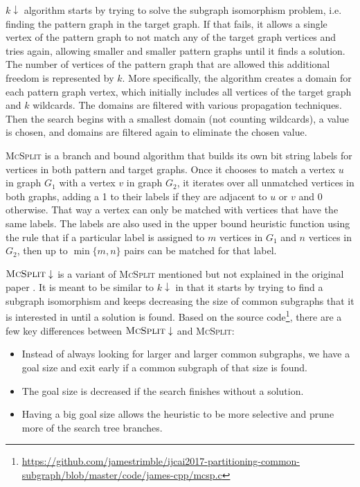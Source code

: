 \documentclass{article}
\theoremstyle{definition}
\theoremstyle{remark}
\begin{document}
$k\downarrow$ algorithm \cite{DBLP:conf/aaai/HoffmannMR17} starts by trying to
solve the subgraph isomorphism problem, i.e. finding the pattern graph in the
target graph. If that fails, it allows a single vertex of the pattern graph to
not match any of the target graph vertices and tries again, allowing smaller and
smaller pattern graphs until it finds a solution. The number of vertices of the
pattern graph that are allowed this additional freedom is represented by $k$.
More specifically, the algorithm creates a domain for each pattern graph vertex,
which initially includes all vertices of the target graph and $k$ wildcards. The
domains are filtered with various propagation techniques. Then the search begins
with a smallest domain (not counting wildcards), a value is chosen, and domains
are filtered again to eliminate the chosen value.

\textsc{McSplit} \cite{DBLP:conf/ijcai/McCreeshPT17} is a branch and bound
algorithm that builds its own bit string labels for vertices in both pattern and
target graphs. Once it chooses to match a vertex $u$ in graph $G_1$ with a
vertex $v$ in graph $G_2$, it iterates over all unmatched vertices in both
graphs, adding a 1 to their labels if they are adjacent to $u$ or $v$ and 0
otherwise. That way a vertex can only be matched with vertices that have the
same labels. The labels are also used in the upper bound heuristic function
using the rule that if a particular label is assigned to $m$ vertices in $G_1$
and $n$ vertices in $G_2$, then up to $\min \{ m, n \}$ pairs can be matched for
that label.

$\textsc{McSplit} \downarrow$ is a variant of \textsc{McSplit} mentioned but not
explained in the original paper \cite{DBLP:conf/ijcai/McCreeshPT17}. It is meant
to be similar to $k\downarrow$ in that it starts by trying to find a subgraph
isomorphism and keeps decreasing the size of common subgraphs that it is
interested in until a solution is found. Based on the source
code\footnote{\url{https://github.com/jamestrimble/ijcai2017-partitioning-common-subgraph/blob/master/code/james-cpp/mcsp.c}},
there are a few key differences between $\textsc{McSplit} \downarrow$ and
\textsc{McSplit}:
\begin{itemize}
\item Instead of always looking for larger and larger common subgraphs, we have
  a goal size and exit early if a common subgraph of that size is found.
\item The goal size is decreased if the search finishes without a solution.
\item Having a big goal size allows the heuristic to be more selective and prune
  more of the search tree branches.
\end{itemize}
\end{document}

